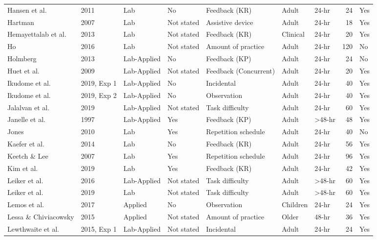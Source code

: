 \documentclass[
  english,
  man,floatsintext]{apa7}
\begin{document}
\begin{landscape}
\begin{ThreePartTable}
\begin{longtable}[l]{lllllllrl}
\addlinespace
Hansen et al. & 2011 & Lab & No & Feedback (KR) & Adult & 24-hr & 24 & Yes\\
\addlinespace
Hartman & 2007 & Lab & Not stated & Assistive device & Adult & 24-hr & 18 & Yes\\
\addlinespace
Hemayettalab et al. & 2013 & Lab & Not stated & Feedback (KR) & Clinical & 24-hr & 20 & Yes\\
\addlinespace
Ho & 2016 & Lab & Not stated & Amount of practice & Adult & 24-hr & 120 & No\\
\addlinespace
Holmberg & 2013 & Lab-Applied & No & Feedback (KP) & Adult & 24-hr & 24 & No\\
\addlinespace
Huet et al. & 2009 & Lab-Applied & Not stated & Feedback (Concurrent) & Adult & 24-hr & 20 & Yes\\
\addlinespace
Ikudome et al. & 2019, Exp 1 & Lab-Applied & No & Incidental & Adult & 24-hr & 40 & Yes\\
\addlinespace
Ikudome et al. & 2019, Exp 2 & Lab-Applied & No & Observation & Adult & 24-hr & 40 & Yes\\
\addlinespace
Jalalvan et al. & 2019 & Lab-Applied & Not stated & Task difficulty & Adult & 24-hr & 60 & Yes\\
\addlinespace
Janelle et al. & 1997 & Lab-Applied & Yes & Feedback (KP) & Adult & >48-hr & 48 & Yes\\
\addlinespace
Jones & 2010 & Lab & Yes & Repetition schedule & Adult & 24-hr & 40 & No\\
\addlinespace
Kaefer et al. & 2014 & Lab & No & Feedback (KR) & Adult & 24-hr & 56 & Yes\\
\addlinespace
Keetch \& Lee & 2007 & Lab & Yes & Repetition schedule & Adult & 24-hr & 96 & Yes\\
\addlinespace
Kim et al. & 2019 & Lab & Yes & Feedback (KR) & Adult & 24-hr & 42 & Yes\\
\addlinespace
Leiker et al. & 2016 & Lab-Applied & Not stated & Task difficulty & Adult & >48-hr & 60 & Yes\\
\addlinespace
Leiker et al. & 2019 & Lab & Not stated & Task difficulty & Adult & >48-hr & 60 & Yes\\
\addlinespace
Lemos et al. & 2017 & Applied & No & Observation & Children & 24-hr & 24 & Yes\\
\addlinespace
Lessa \& Chiviacowsky & 2015 & Applied & Not stated & Amount of practice & Older & 48-hr & 36 & Yes\\
\addlinespace
Lewthwaite et al. & 2015, Exp 1 & Lab-Applied & Not stated & Incidental & Adult & 24-hr & 24 & Yes\\

\end{longtable}
\end{ThreePartTable}
\end{landscape}
\end{document}
